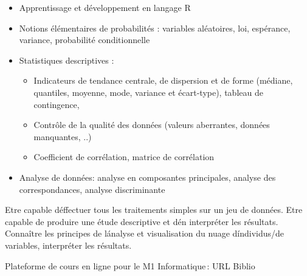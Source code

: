 {
\begin{itemize}
\item Apprentissage et développement en langage R
\item Notions élémentaires de probabilités : variables aléatoires, loi, espérance, variance, probabilité conditionnelle
\item Statistiques descriptives :
 \begin{itemize}
 \item Indicateurs de tendance centrale, de dispersion et de forme (médiane, quantiles, moyenne, mode, variance et écart-type), tableau de contingence,
 \item Contrôle de la qualité des données (valeurs aberrantes, données manquantes, ..)
 \item Coefficient de corrélation, matrice de corrélation
 \end{itemize} 
\item Analyse de données: analyse en composantes principales, analyse des correspondances, analyse discriminante
\end{itemize} 
} 
{} 
{\begin{itemize}
\ObjItem Etre capable d\'effectuer tous les traitements simples sur un jeu de données.
\ObjItem Etre capable de produire une étude descriptive et d\'en interpréter les résultats.
\ObjItem Connaître les principes de l\'analyse et visualisation du nuage d\'individus/de variables, interpréter les résultats.
\end{itemize} 
} 
{Plateforme de cours en ligne pour le M1 Informatique\,: URL} 
{Biblio} 
 
\vfill

